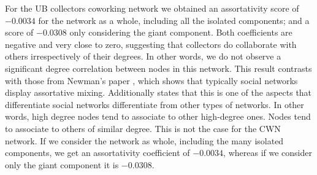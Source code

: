 For the UB collectors coworking network we obtained an assortativity score of $-0.0034$ for the network as a whole, including all the isolated components; and a score of $-0.0308$ only considering the giant component.
Both coefficients are negative and very close to zero, suggesting that collectors do collaborate with others irrespectively of their degrees. In other words, we do not observe a significant degree correlation between nodes in this network. 
This result contrasts with those from Newman's paper \cite{Newman2003b}, which shows that typically social networks display assortative mixing. Additionally states that this is one of the aspects that differentiate social networks differentiate from other types of networks. In other words, high degree nodes tend to associate to other high-degree ones. Nodes tend to associate to others of similar degree.
This is not the case for the CWN network. If we consider the network as whole, including the many isolated components, we get an assortativity coefficient of $-0.0034$, whereas if we consider only the giant component it is $-0.0308$. 


 
 








